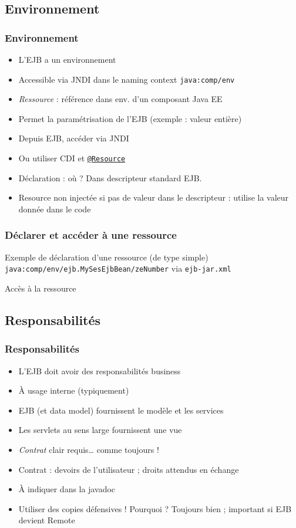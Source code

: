 \documentclass[english, french]{beamer}
\begin{document}
\subsection{Environnement}
\begin{frame}
	\frametitle{Environnement}
	\begin{itemize}
		\item L’EJB a un environnement
		\item Accessible via JNDI dans le naming context \texttt{java:comp/env}
		\item \emph{Ressource} : référence dans env. d’un composant Java EE
		\item Permet la paramétrisation de l’EJB (exemple : valeur entière)
		\item Depuis EJB, accéder via JNDI
		\item Ou utiliser CDI et \href{http://docs.oracle.com/javaee/7/api/javax/annotation/Resource.html}{\texttt{@Resource}}
		\item Déclaration : où ? \pause Dans descripteur standard EJB.\pause
		\item Resource non injectée si pas de valeur dans le descripteur : utilise la valeur donnée dans le code
	\end{itemize}
\end{frame}

\begin{frame}[fragile]
	\frametitle{Déclarer et accéder à une ressource}
	Exemple de déclaration d’une ressource (de type \og{}simple\fg{}) \texttt{java:comp/env/ejb.MySesEjbBean/zeNumber} via \texttt{ejb-jar.xml}
	
	Accès à la ressource
	
\end{frame}

\subsection{Responsabilités}
\begin{frame}
	\frametitle{Responsabilités}
	\begin{itemize}
		\item L’EJB doit avoir des responsabilités business
		\item À usage interne {\tiny (typiquement)}
		\item EJB {\tiny (et data model)} fournissent le modèle et les services
		\item Les servlets {\tiny au sens large} fournissent une vue
		\item \emph{Contrat} clair requis… comme toujours !
		\item Contrat : devoirs de l’utilisateur ; droits attendus en échange
		\item À indiquer dans la javadoc
		\item Utiliser des copies défensives ! Pourquoi ? \pause Toujours bien ; important si EJB devient Remote
	\end{itemize}
\end{frame}
\end{document}
